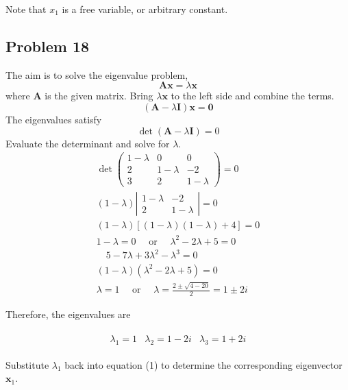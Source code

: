 \documentclass[12pt]{article}
\begin{document}
Note that \(x_{1}\) is a free variable, or arbitrary constant.
\subsection*{Problem 18}
\label{sec:org6b68ad9}
   The aim is to solve the eigenvalue problem,
$$
\mathbf{A} \mathbf{x}=\lambda \mathbf{x}
$$
where \(\mathbf{A}\) is the given matrix. Bring \(\lambda \mathbf{x}\) to the left side and combine the terms.
$$
(\mathbf{A}-\lambda \mathbf{I}) \mathbf{x}=\mathbf{0}
$$
The eigenvalues satisfy
$$
\operatorname{det}(\mathbf{A}-\lambda \mathbf{I})=0
$$
Evaluate the determinant and solve for \(\lambda\).
\begin{equation*}
	\begin{array}{c}
		\operatorname{det}\left(\begin{array}{ccc}
				1-\lambda & 0         & 0         \\
				2         & 1-\lambda & -2        \\
				3         & 2         & 1-\lambda
			\end{array}\right)=0     \\
		(1-\lambda)\left|\begin{array}{cc}
			1-\lambda & -2        \\
			2         & 1-\lambda
		\end{array}\right|=0            \\
		(1-\lambda)[(1-\lambda)(1-\lambda)+4]=0                        \\
		1-\lambda=0 \quad \text { or } \quad \lambda^{2}-2 \lambda+5=0 \\
		\quad 5-7 \lambda+3 \lambda^{2}-\lambda^{3}=0                  \\
		(1-\lambda)\left(\lambda^{2}-2 \lambda+5\right)=0              \\
		\lambda=1 \quad \text { or } \quad \lambda=\frac{2 \pm \sqrt{4-20}}{2}=1 \pm 2 i
	\end{array}
\end{equation*}

Therefore, the eigenvalues are

\begin{align*}
\begin{array}{|l|l|l|l|}
\hline \lambda_{1}=1 & \lambda_{2}=1-2 i & \lambda_{3}=1+2 i
\end{array}
\end{align*}

Substitute \(\lambda_{1}\) back into equation (1) to determine the corresponding
eigenvector \(\mathbf{x}_{1}\). 
\end{document}
